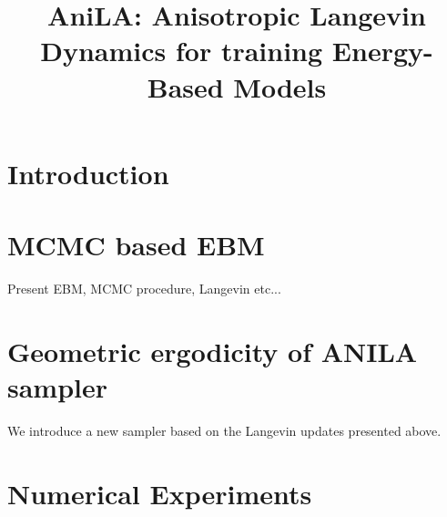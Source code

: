 \documentclass{article}
\begin{document}
\title{AniLA: Anisotropic Langevin Dynamics for training Energy-Based Models}


\date{}
\maketitle

\begin{abstract}
\end{abstract}

\section{Introduction}

\section{MCMC based EBM}

Present EBM, MCMC procedure, Langevin etc...

\section{Geometric ergodicity of ANILA sampler}

We introduce a new sampler based on the Langevin updates presented above.



\section{Numerical Experiments}

\newpage






\end{document}
